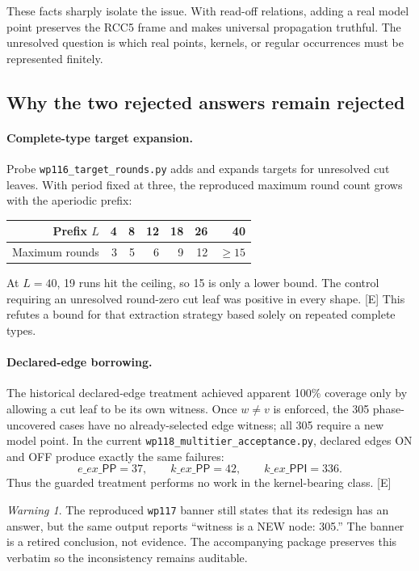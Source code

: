 \documentclass[11pt,letterpaper]{article}
\newcommand{\PP}{\ensuremath{\mathsf{PP}}}
\newcommand{\PPI}{\ensuremath{\mathsf{PPI}}}
\newcommand{\code}[1]{\nolinkurl{#1}}
\theoremstyle{definition}
\theoremstyle{plain}
\theoremstyle{remark}
\newtheorem{warning}[definition]{Warning}
\begin{document}
These facts sharply isolate the issue.  With read-off relations, adding a real
model point preserves the RCC5 frame and makes universal propagation truthful.
The unresolved question is which real points, kernels, or regular occurrences
must be represented finitely.

\subsection{Why the two rejected answers remain rejected}

\paragraph{Complete-type target expansion.}
Probe \code{wp116_target_rounds.py} adds and expands targets for unresolved cut
leaves.  With period fixed at three, the reproduced maximum round count grows
with the aperiodic prefix:

\begin{center}
\begin{tabular}{rrrrrrr}
\toprule
Prefix $L$ & 4 & 8 & 12 & 18 & 26 & 40 \\
\midrule
Maximum rounds & 3 & 5 & 6 & 9 & 12 & $\geq 15$ \\
\bottomrule
\end{tabular}
\end{center}

At $L=40$, 19 runs hit the ceiling, so 15 is only a lower bound.  The control
requiring an unresolved round-zero cut leaf was positive in every shape. [E]
This refutes a bound for that extraction strategy based solely on repeated
complete types.

\paragraph{Declared-edge borrowing.}
The historical declared-edge treatment achieved apparent 100\% coverage only
by allowing a cut leaf to be its own witness.  Once $w\neq v$ is enforced, the
305 phase-uncovered cases have no already-selected edge witness; all 305 require
a new model point.  In the current \code{wp118_multitier_acceptance.py}, declared
edges ON and OFF produce exactly the same failures:
\[
  e\_ex\_\PP=37,\qquad k\_ex\_\PP=42,\qquad k\_ex\_\PPI=336.
\]
Thus the guarded treatment performs no work in the kernel-bearing class. [E]

\begin{warning}
The reproduced \code{wp117} banner still states that its redesign has an answer,
but the same output reports ``witness is a NEW node: 305.''  The banner is a
retired conclusion, not evidence.  The accompanying package preserves this
verbatim so the inconsistency remains auditable.
\end{warning}
\end{document}
